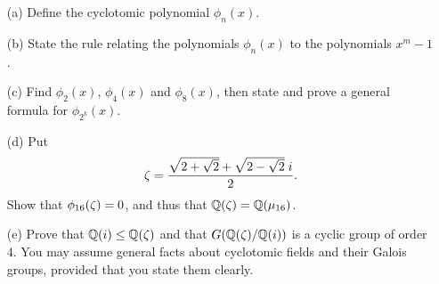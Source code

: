 \documentclass[a4paper]{article}
\begin{document}
\begin{problem}%
 \begin{itemize}
  \item[(a)] Define the cyclotomic polynomial $\phi_n(x)$. 
  \item[(b)] State the rule relating the polynomials $\phi_n(x)$ to
   the polynomials $x^m-1$. 
  \item[(c)] Find $\phi_2(x)$, $\phi_4(x)$ and $\phi_8(x)$, then state
   and prove a general formula for $\phi_{2^k}(x)$. 
  \item[(d)] Put 
   \[ \zeta = \frac{\sqrt{2+\sqrt{2}}+\sqrt{2-\sqrt{2}}\;i}{2}. 
   \]
   Show that $\phi_{16}(\zeta)=0$, and thus that ${\mathbb{Q}}(\zeta)={\mathbb{Q}}(\mu_{16})$. 
  \item[(e)] Prove that ${\mathbb{Q}}(i)\leq{\mathbb{Q}}(\zeta)$ and that $G({\mathbb{Q}}(\zeta)/{\mathbb{Q}}(i))$
   is a cyclic group of order $4$.  You may assume general facts about
   cyclotomic fields and their Galois groups, provided that you state
   them clearly. 
 \end{itemize}
\end{problem}
\end{document}
